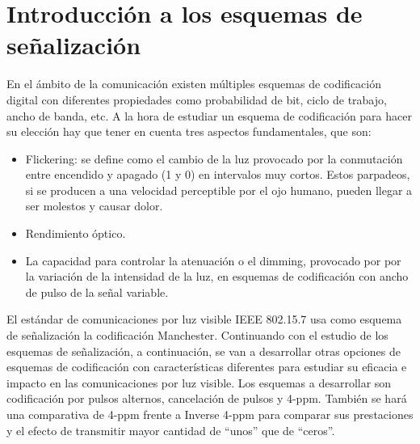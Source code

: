 
\label{chp:App}
\minitoc

\section{Introducción a los esquemas de señalización}

En el ámbito de la comunicación existen múltiples esquemas de codificación digital con diferentes propiedades como 
probabilidad de bit, ciclo de trabajo, ancho de banda, etc. A la hora de estudiar un esquema de codificación para hacer 
su elección hay que tener en cuenta tres aspectos fundamentales, que son:
\begin{itemize}
    \item Flickering: se define como el cambio de la luz provocado por la conmutación entre encendido 
y apagado (1 y 0) en intervalos muy cortos. 
Estos parpadeos, si se producen a una velocidad perceptible por el ojo humano, pueden llegar a ser molestos y causar dolor. 
    \item Rendimiento óptico.
    \item La capacidad para controlar la atenuación o el dimming, provocado por por la variación de la intensidad de la luz, 
    en esquemas de codificación con ancho de pulso de la señal variable. 
\end{itemize} 

El estándar de comunicaciones por luz visible IEEE 802.15.7 usa como esquema de señalización la codificación Manchester. 
Continuando con el estudio de los esquemas de señalización,
a continuación, se van a desarrollar otras opciones de esquemas de codificación con características diferentes
para estudiar su eficacia e impacto en las comunicaciones por luz visible.
Los esquemas a desarrollar son codificación por pulsos alternos, cancelación de pulsos y 4-ppm. También se hará una 
comparativa de 4-ppm frente a Inverse 4-ppm para comparar sus prestaciones y el efecto de transmitir mayor cantidad 
de ``unos'' que de ``ceros''.

